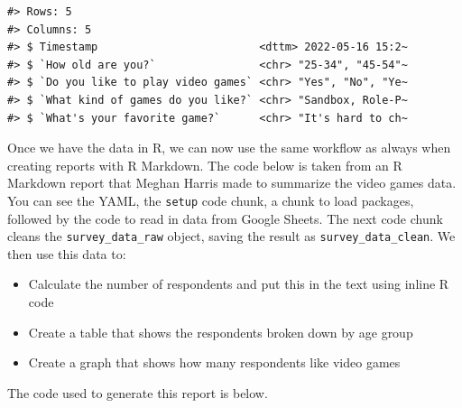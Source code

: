 \documentclass[
]{book}
\providecommand{\tightlist}{%
  \setlength{\itemsep}{0pt}\setlength{\parskip}{0pt}}
\begin{document}
\begin{verbatim}
#> Rows: 5
#> Columns: 5
#> $ Timestamp                         <dttm> 2022-05-16 15:2~
#> $ `How old are you?`                <chr> "25-34", "45-54"~
#> $ `Do you like to play video games` <chr> "Yes", "No", "Ye~
#> $ `What kind of games do you like?` <chr> "Sandbox, Role-P~
#> $ `What's your favorite game?`      <chr> "It's hard to ch~
\end{verbatim}

Once we have the data in R, we can now use the same workflow as always when creating reports with R Markdown. The code below is taken from an R Markdown report that Meghan Harris made to summarize the video games data. You can see the YAML, the \texttt{setup} code chunk, a chunk to load packages, followed by the code to read in data from Google Sheets. The next code chunk cleans the \texttt{survey\_data\_raw} object, saving the result as \texttt{survey\_data\_clean}. We then use this data to:

\begin{itemize}
\tightlist
\item
  Calculate the number of respondents and put this in the text using inline R code
\item
  Create a table that shows the respondents broken down by age group
\item
  Create a graph that shows how many respondents like video games
\end{itemize}

The code used to generate this report is below.
\end{document}
